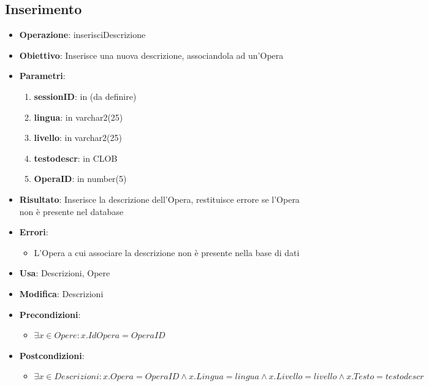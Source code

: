 \documentclass[a4paper,11pt]{article}
\begin{document}
\subsection{Inserimento}
\begin{itemize}
	\item \textbf{Operazione}: inserisciDescrizione
	\item \textbf{Obiettivo}: Inserisce una nuova descrizione, associandola ad un'Opera
	\item \textbf{Parametri}:
	\begin{enumerate}
		\item \textbf{sessionID}: in (da definire)
		\item \textbf{lingua}: in varchar2(25)
		\item \textbf{livello}: in varchar2(25)
		\item \textbf{testodescr}: in CLOB
		\item \textbf{OperaID}: in number(5)
	\end{enumerate}
	\item \textbf{Risultato}: Inserisce la descrizione dell'Opera, restituisce errore se l'Opera non è presente nel database
	\item \textbf{Errori}: 
	\begin{itemize}
		\item L'Opera a cui associare la descrizione non è presente nella base di dati
	\end{itemize}
	\item \textbf{Usa}: Descrizioni, Opere
	\item \textbf{Modifica}: Descrizioni
	\item \textbf{Precondizioni}:
	\begin{itemize}
		\item $\exists x \in Opere : x.IdOpera = OperaID$
	\end{itemize}
	\item \textbf{Postcondizioni}:
	\begin{itemize}
		\item $\exists x \in Descrizioni : x.Opera = OperaID \land x.Lingua = lingua \land x.Livello = livello \land x.Testo = testodescr$
	\end{itemize}
\end{itemize}

\end{document}
